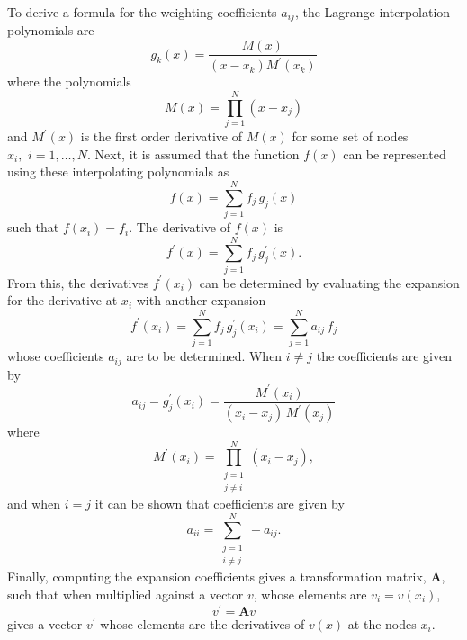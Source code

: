 To derive a formula for the weighting coefficients $a_{ij}$, the Lagrange interpolation polynomials are
\begin{equation}
    g_k(x) = \dfrac{M(x)}{(x - x_k) M^{\prime}(x_k)}
\end{equation}
where the polynomials
\begin{equation}
    M(x) = \prod_{j=1}^N (x - x_j)
\end{equation}
and $M^{\prime}(x)$ is the first order derivative of $M(x)$ for some set of nodes $x_i, \,\, i = 1,\ldots,N$. Next, it is assumed that the function $f(x)$ can be represented using these interpolating polynomials as
\begin{equation}
    f(x) = \sum_{j=1}^N f_j \, g_j(x)
\end{equation}
such that $f(x_i) = f_i$. The derivative of $f(x)$ is
\begin{equation}
    f^{\prime}(x) = \sum_{j=1}^N f_j \, g_j^{\prime}(x).
\end{equation}
From this, the derivatives $f^{\prime}(x_i)$ can be determined by evaluating the expansion for the derivative at $x_i$ with another expansion
\begin{equation}
    f^{\prime}(x_i) = \sum_{j=1}^N f_j \, g_j^{\prime}(x_i) = \sum_{j=1}^N a_{ij} \, f_j
\end{equation}
whose coefficients $a_{ij}$ are to be determined. When $i \neq j$ the coefficients are given by
\begin{equation}
    a_{ij} = g_j^{\prime}(x_i) = \dfrac{M^{\prime}(x_i)}{(x_i - x_j) \, M^{\prime}(x_j)}
\end{equation}
where 
\begin{equation}
    M^{\prime}(x_i) = \prod\limits_{\substack{j = 1 \\ j \neq i}}^N (x_i - x_j),
\end{equation}
and when $i = j$ it can be shown \cite{Shu-2000} that coefficients are given by
\begin{equation}
    a_{ii} = \sum\limits_{\substack{j=1 \\ i \neq j}}^N - a_{ij}.
\end{equation}
Finally, computing the expansion coefficients gives a transformation matrix, $\boldsymbol{A}$, such that when multiplied against a vector $v$, whose elements are $v_i = v(x_i)$,
\begin{equation} \label{eqn:DQ_method}
    v^{\prime} = \boldsymbol{A} v
\end{equation}
gives a vector $v^{\prime}$ whose elements are the derivatives of $v(x)$ at the nodes $x_i$. 

